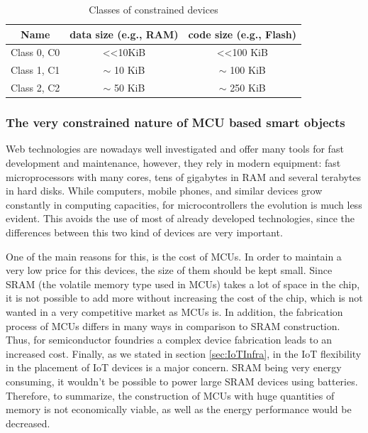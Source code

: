 \begin{table}[htb]
	\centering
	\caption{Classes of constrained devices}
	\label{tab:DeviceClass}
	\begin{tabular}{|c|c|c|}
		\hline
		Name        & data size (e.g., RAM)    & code size (e.g., Flash)    \\ \hline
		Class 0, C0 & \textless\textless 10KiB & \textless\textless 100 KiB \\ \hline
		Class 1, C1 & $\sim$ 10 KiB                 & $\sim$ 100 KiB                  \\ \hline
		Class 2, C2 & $\sim$ 50 KiB                 & $\sim$ 250 KiB                  \\ \hline
	\end{tabular}
\end{table}



\subsubsection{The very constrained nature of MCU based smart objects}
Web technologies are nowadays well investigated and offer many tools for fast development and maintenance, however, they rely in modern equipment: fast microprocessors with many cores, tens of gigabytes in RAM and several terabytes in hard disks.
While computers, mobile phones, and similar devices grow constantly in computing capacities, for microcontrollers the evolution is much less evident.
This avoids the use of most of already developed technologies, since the differences between this two kind of devices are very important.

One of the main reasons for this, is the cost of MCUs.
In order to maintain a very low price for this devices, the size of them should be kept small.
Since SRAM (the volatile memory type used in MCUs) takes a lot of space in the chip, it is not possible to add more without increasing the cost of the chip, which is not wanted in a very competitive market as MCUs is.
In addition, the fabrication process of MCUs differs in many ways in comparison to SRAM construction.
Thus, for semiconductor foundries a complex device fabrication leads to an increased cost.
Finally, as we stated in section \ref{sec:IoTInfra}, in the IoT flexibility in the placement of IoT devices is a major concern.
SRAM being very energy consuming, it wouldn't be possible to power large SRAM devices using batteries.
Therefore, to summarize, the construction of MCUs with huge quantities of memory is not economically viable, as well as the energy performance would be decreased.

